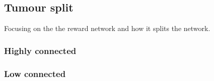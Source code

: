 \subsection{Tumour split} \label{s:n_ii:rwd}


Focusing on the the reward network and how it splits the network.

\subsubsection{Highly connected}

\subsubsection{Low connected}